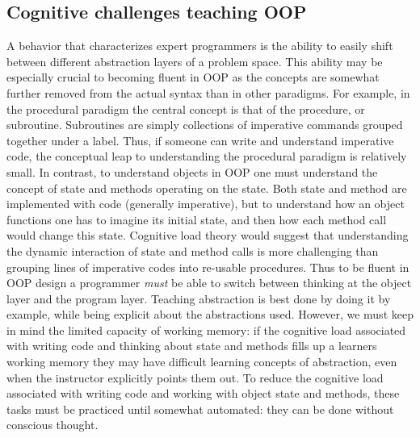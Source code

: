 \documentclass[12pt]{article}
\begin{document}
\subsection*{Cognitive challenges teaching OOP}
A behavior that characterizes expert programmers is the ability to
easily shift between different abstraction layers of a problem
space\autocite{armoni_teaching_2013}. This ability may be especially
crucial to becoming fluent in OOP as the concepts are somewhat further
removed from the actual syntax than in other paradigms. For example,
in the procedural paradigm the central concept is that of the
procedure, or subroutine. Subroutines are simply collections of
imperative commands grouped together under a label. Thus, if someone
can write and understand imperative code, the conceptual leap to
understanding the procedural paradigm is relatively small. In
contrast, to understand objects in OOP one must understand the concept
of state and methods operating on the state. Both state and method are
implemented with code (generally imperative), but to understand how an
object functions one has to imagine its initial state, and then how
each method call would change this state. Cognitive load theory would
suggest that understanding the dynamic interaction of state and method
calls is more challenging than grouping lines of imperative codes into
re-usable procedures. Thus to be fluent in OOP design a programmer
\emph{must} be able to switch between thinking at the object layer and
the program layer. Teaching abstraction is best done by doing it by
example, while being explicit about the abstractions
used\autocite{armoni_teaching_2013}. However, we must keep in mind the
limited capacity of working memory: if the cognitive load associated
with writing code and thinking about state and methods fills up a
learners working memory they may have difficult learning concepts of
abstraction, even when the instructor explicitly points them out. To
reduce the cognitive load associated with writing code and working
with object state and methods, these tasks must be practiced until
somewhat automated: they can be done without conscious
thought\autocite{ambrose_chapter_2010}.
\end{document}
